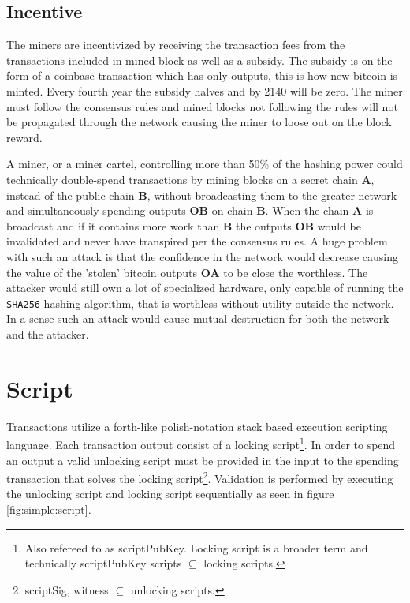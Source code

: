 \subsection{Incentive}

The miners are incentivized by receiving the transaction fees from the transactions included in mined block as well as a subsidy. The subsidy is on the form of a coinbase transaction which has only outputs, this is how new bitcoin is minted. Every fourth year the subsidy halves and by 2140 will be zero. The miner must follow the consensus rules and mined blocks not following the rules will not be propagated through the network causing the miner to loose out on the block reward.

A miner, or a miner cartel, controlling more than 50\% of the hashing power could technically double-spend transactions by mining blocks on a secret chain \textbf{A}, instead of the public chain \textbf{B}, without broadcasting them to the greater network and simultaneously spending outputs \textbf{OB} on chain \textbf{B}. When the chain \textbf{A} is broadcast and if it contains more work than \textbf{B} the outputs \textbf{OB} would be invalidated and never have transpired per the consensus rules. A huge problem with such an attack is that the confidence in the network would decrease causing the value of the 'stolen' bitcoin outputs \textbf{OA} to be close the worthless. The attacker would still own a lot of specialized hardware, only capable of running the \texttt{SHA256} hashing algorithm, that is worthless without utility outside the network. In a sense such an attack would cause mutual destruction for both the network and the attacker. 

\section{Script}
\label{sec:script}

Transactions utilize a forth-like polish-notation stack based execution scripting language\cite{antonopoulos:mastering:bitcoin}. Each transaction output consist of a locking script\footnote{Also refereed to as scriptPubKey. Locking script is a broader term and technically scriptPubKey scripts $ \subseteq $ locking scripts.}. In order to spend an output a valid unlocking script must be provided in the input to the spending transaction that solves the locking script\footnote{scriptSig, witness $\subseteq $ unlocking scripts.}. Validation is performed by executing the unlocking script and locking script sequentially as seen in figure \ref{fig:simple:script}. 

